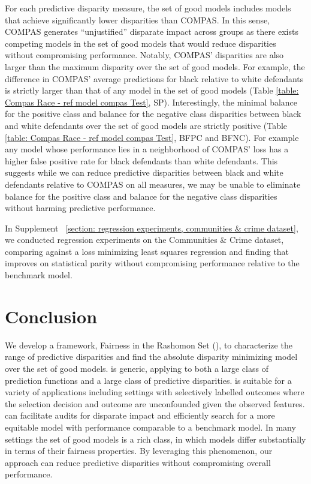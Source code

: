 \documentclass{article}
\begin{document}
For each predictive disparity measure, the set of good models includes models that achieve significantly lower disparities than COMPAS. In this sense, COMPAS generates ``unjustified'' disparate impact across groups as there exists competing models in the set of good models that would reduce disparities without compromising performance. Notably, COMPAS' disparities are also larger than the maximum disparity over the set of good models. For example, the difference in COMPAS' average predictions for black relative to white defendants is strictly larger than that of any model in the set of good models (Table \ref{table: Compas Race - ref model compas Test}, SP).  
Interestingly, the minimal balance for the positive class and balance for the negative class disparities between black and white defendants over the set of good models are strictly positive (Table \ref{table: Compas Race - ref model compas Test}, BFPC and BFNC). For example any model whose performance lies in a neighborhood of COMPAS' loss has a higher false positive rate for black defendants than white defendants. This suggests while we can reduce predictive disparities between black and white defendants relative to COMPAS on all measures, we may be unable to eliminate balance for the positive class and balance for the negative class disparities without harming predictive performance. 

In Supplement ~\textsection \ref{section: regression experiments, communities & crime dataset}, we conducted regression experiments on the Communities \& Crime dataset, comparing \fairs against a loss minimizing least squares regression and finding that \fairs improves on statistical parity without compromising performance relative to the benchmark model.

\section{Conclusion}
We develop a framework, Fairness in the Rashomon Set (\fairs), to characterize the range of predictive disparities and find the absolute disparity minimizing model over the set of good models. \fairs is generic, applying to both a large class of prediction functions and a large class of predictive disparities. \fairs is suitable for a variety of applications including settings with selectively labelled outcomes where the selection decision and outcome are unconfounded given the observed features. \fairs can facilitate audits for disparate impact and efficiently search for a more equitable model with performance comparable to a benchmark model. In many settings the set of good models is a rich class, in which models differ substantially in terms of their fairness properties. By leveraging this phenomenon, our approach can reduce predictive disparities without compromising overall performance. 
\end{document}
